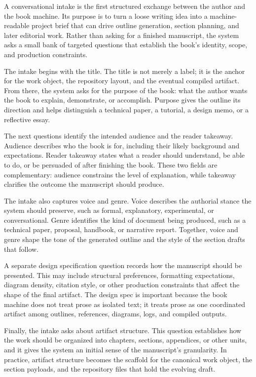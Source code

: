 A conversational intake is the first structured exchange between the author and the book machine. Its purpose is to turn a loose writing idea into a machine-readable project brief that can drive outline generation, section planning, and later editorial work. Rather than asking for a finished manuscript, the system asks a small bank of targeted questions that establish the book's identity, scope, and production constraints.

The intake begins with the title. The title is not merely a label; it is the anchor for the work object, the repository layout, and the eventual compiled artifact. From there, the system asks for the purpose of the book: what the author wants the book to explain, demonstrate, or accomplish. Purpose gives the outline its direction and helps distinguish a technical paper, a tutorial, a design memo, or a reflective essay.

The next questions identify the intended audience and the reader takeaway. Audience describes who the book is for, including their likely background and expectations. Reader takeaway states what a reader should understand, be able to do, or be persuaded of after finishing the book. These two fields are complementary: audience constrains the level of explanation, while takeaway clarifies the outcome the manuscript should produce.

The intake also captures voice and genre. Voice describes the authorial stance the system should preserve, such as formal, explanatory, experimental, or conversational. Genre identifies the kind of document being produced, such as a technical paper, proposal, handbook, or narrative report. Together, voice and genre shape the tone of the generated outline and the style of the section drafts that follow.

A separate design specification question records how the manuscript should be presented. This may include structural preferences, formatting expectations, diagram density, citation style, or other production constraints that affect the shape of the final artifact. The design spec is important because the book machine does not treat prose as isolated text; it treats prose as one coordinated artifact among outlines, references, diagrams, logs, and compiled outputs.

Finally, the intake asks about artifact structure. This question establishes how the work should be organized into chapters, sections, appendices, or other units, and it gives the system an initial sense of the manuscript's granularity. In practice, artifact structure becomes the scaffold for the canonical work object, the section payloads, and the repository files that hold the evolving draft.

